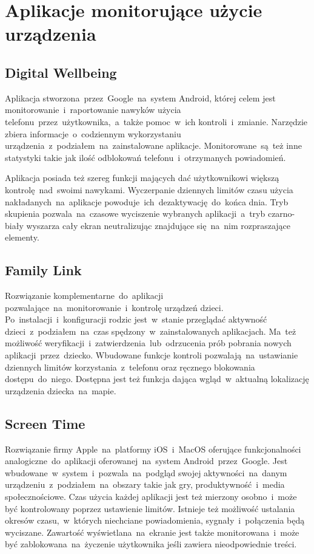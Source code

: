 \section{Aplikacje monitorujące użycie urządzenia}

\subsection{Digital Wellbeing}
\label{sec:digital_wellbeing}
Aplikacja stworzona~przez~Google~na~system Android, której celem jest monitorowanie~i~raportowanie nawyków użycia telefonu~przez~użytkownika,~a~także pomoc~w~ich kontroli~i~zmianie. Narzędzie zbiera informacje~o~codziennym wykorzystaniu urządzenia~z~podziałem~na~zainstalowane aplikacje. Monitorowane~są~też inne statystyki takie jak ilość odblokowań telefonu~i~otrzymanych powiadomień. 
\bigskip
{}

Aplikacja posiada też szereg funkcji mających dać użytkownikowi większą kontrolę~nad~swoimi nawykami. Wyczerpanie dziennych limitów czasu użycia nakładanych~na~aplikacje powoduje~ich~dezaktywację~do~końca dnia. Tryb skupienia pozwala~na~czasowe wyciszenie wybranych aplikacji~a~tryb czarno-biały wyszarza cały ekran neutralizując znajdujące się~na~nim rozpraszające elementy.

\subsection{Family Link}
Rozwiązanie komplementarne~do~aplikacji  pozwalające~na~monitorowanie~i~kontrolę urządzeń dzieci. Po~instalacji~i~konfiguracji rodzic jest~w~stanie przeglądać aktywność dzieci~z~podziałem~na~czas spędzony~w~zainstalowanych aplikacjach. Ma~też możliwość weryfikacji~i~zatwierdzenia~lub~odrzucenia prób pobrania nowych aplikacji~przez~dziecko. Wbudowane funkcje kontroli pozwalają~na~ustawianie dziennych limitów korzystania~z~telefonu oraz ręcznego blokowania dostępu~do~niego. Dostępna jest też funkcja dająca wgląd~w~aktualną lokalizację urządzenia dziecka~na~mapie.

\subsection{Screen Time}
Rozwiązanie firmy Apple~na~platformy iOS~i~MacOS oferujące funkcjonalności analogiczne~do~aplikacji  oferowanej~na~system Android~przez~Google. Jest wbudowane~w~system~i~pozwala~na~podgląd swojej aktywności~na~danym urządzeniu~z~podziałem~na~obszary takie jak gry, produktywność~i~media społecznościowe. Czas użycia każdej aplikacji jest też mierzony osobno~i~może być kontrolowany poprzez ustawienie limitów. Istnieje też możliwość ustalania okresów czasu,~w~których niechciane powiadomienia, sygnały~i~połączenia będą wyciszane. Zawartość wyświetlana~na~ekranie jest także monitorowana~i~może być zablokowana~na~życzenie użytkownika jeśli zawiera nieodpowiednie treści.


